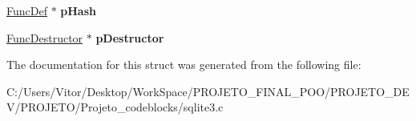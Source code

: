 \begin{DoxyCompactItemize}
\item 
\hypertarget{struct_func_def_a04561444155a6922d6a2d99a29d35281}{\hyperlink{struct_func_def}{Func\-Def} $\ast$ {\bfseries p\-Hash}}\label{struct_func_def_a04561444155a6922d6a2d99a29d35281}

\item 
\hypertarget{struct_func_def_a1bd12675375b838b5c00b1c79c1e6301}{\hyperlink{struct_func_destructor}{Func\-Destructor} $\ast$ {\bfseries p\-Destructor}}\label{struct_func_def_a1bd12675375b838b5c00b1c79c1e6301}

\end{DoxyCompactItemize}


The documentation for this struct was generated from the following file\-:\begin{DoxyCompactItemize}
\item 
C\-:/\-Users/\-Vitor/\-Desktop/\-Work\-Space/\-P\-R\-O\-J\-E\-T\-O\-\_\-\-F\-I\-N\-A\-L\-\_\-\-P\-O\-O/\-P\-R\-O\-J\-E\-T\-O\-\_\-\-D\-E\-V/\-P\-R\-O\-J\-E\-T\-O/\-Projeto\-\_\-codeblocks/sqlite3.\-c\end{DoxyCompactItemize}

